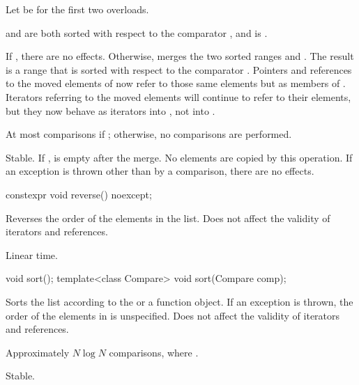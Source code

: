\begin{itemdescr}
\pnum
Let  be  for the first two overloads.

\pnum
\expects
{} and  are both sorted
with respect to the comparator , and
 is .

\pnum
\effects
If , there are no effects.
Otherwise, merges
the two sorted ranges  and .
The result is a range
that is sorted with respect to the comparator .
Pointers and references to the moved elements of  now refer to those same elements
but as members of . Iterators referring to the moved elements will continue to
refer to their elements, but they now behave as iterators into , not into
.

\pnum
\complexity
At most  comparisons
if ;
otherwise, no comparisons are performed.

\pnum
\remarks
Stable.
If ,  is empty after the merge.
No elements are copied by this operation.
If an exception is thrown other than by a comparison, there are no effects.
\end{itemdescr}

%
\begin{itemdecl}
constexpr void reverse() noexcept;
\end{itemdecl}

\begin{itemdescr}
\pnum
\effects
Reverses the order of the elements in the list.
Does not affect the validity of iterators and references.

\pnum
\complexity
Linear time.
\end{itemdescr}

%
\begin{itemdecl}
void sort();
template<class Compare> void sort(Compare comp);
\end{itemdecl}

\begin{itemdescr}
\pnum
\effects
Sorts the list according to the  or a  function object.
If an exception is thrown,
the order of the elements in  is unspecified.
Does not affect the validity of iterators and references.

\pnum
\complexity
Approximately
$N \log N$
comparisons, where
.

\pnum
\remarks
Stable.
\end{itemdescr}

